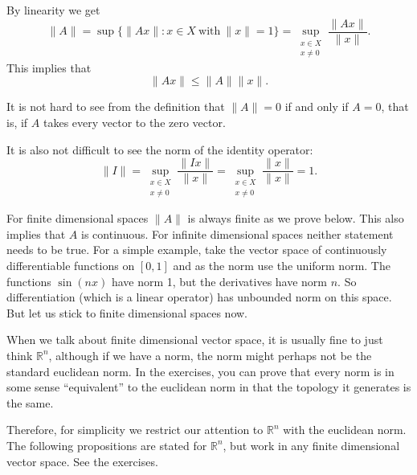 \documentclass[12pt]{book}
\newcommand{\snorm}[1]{\lVert {#1} \rVert}
\newcommand{\R}{{\mathbb{R}}}
\theoremstyle{plain}
\theoremstyle{remark}
\theoremstyle{definition}
\theoremstyle{exercise}
\theoremstyle{example}
\begin{document}
By linearity we get
\begin{equation*}
\snorm{A} =
\sup \{ \snorm{Ax} : x \in X ~ \text{with} ~ \snorm{x} = 1 \}
=
\sup_{\substack{x \in X\\x\neq 0}} \frac{\snorm{Ax}}{\snorm{x}} .
\end{equation*}
This implies that
\begin{equation*}
\snorm{Ax} \leq \snorm{A}  \snorm{x} .
\end{equation*}

It is not hard to see from the definition that $\snorm{A} = 0$ if and
only if $A = 0$, that is, if $A$ takes every vector to the zero vector.

It is also not difficult to see the norm of the identity operator:
\begin{equation*}
\snorm{I} =
\sup_{\substack{x \in X\\x\neq 0}} \frac{\snorm{Ix}}{\snorm{x}} 
=
\sup_{\substack{x \in X\\x\neq 0}} \frac{\snorm{x}}{\snorm{x}} 
= 1.
\end{equation*}

For finite dimensional spaces $\snorm{A}$ is always finite as we prove
below.  This also implies that $A$ is continuous.
For infinite dimensional spaces neither statement needs to be true.  For a simple
example,
take the vector space of continuously differentiable functions on $[0,1]$
and as the norm use the uniform norm.  The functions
$\sin(nx)$ have norm 1, but the derivatives have norm $n$.  So
differentiation (which is a linear operator) has unbounded norm on this
space.  But let us stick to finite dimensional spaces now.

When we talk about finite dimensional vector space, it is usually fine to
just think $\R^n$, although if we have a norm, the norm might perhaps not be
the standard euclidean norm.  In the exercises, you can prove that
every norm is in some sense ``equivalent'' to the euclidean norm in that the
topology it generates is the same.

Therefore, for simplicity we restrict our attention to $\R^n$ with the euclidean
norm.  The following propositions are stated for $\R^n$, but work in any
finite dimensional vector space.  See the exercises.
\end{document}
